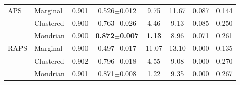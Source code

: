 \begin{table}[!htbp]
\begin{tabular}{llcccccc}
APS & Marginal & 0.901 & 0.526$\pm$0.012 & 9.75 & 11.67 & 0.087 & 0.144\\
 & Clustered & 0.900 & 0.763$\pm$0.026 & 4.46 & 9.13 & 0.085 & 0.250\\
 & Mondrian & 0.900 & \textbf{0.872$\pm$0.007} & \textbf{1.13} & 8.96 & 0.071 & 0.261\\
\addlinespace[2pt]
RAPS & Marginal & 0.900 & 0.497$\pm$0.017 & 11.07 & 13.10 & 0.000 & 0.135\\
 & Clustered & 0.902 & 0.796$\pm$0.018 & 4.55 & 9.08 & 0.000 & 0.270\\
 & Mondrian & 0.901 & 0.871$\pm$0.008 & 1.22 & 9.35 & 0.000 & 0.267\\
\bottomrule
\end{tabular}
\end{table}
